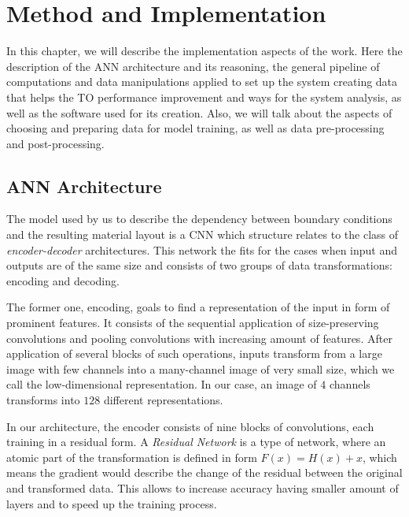 
\chapter{Method and Implementation}

In this chapter, we will describe the implementation aspects of the work.
Here the description of the ANN architecture and its reasoning, the general pipeline of computations and data manipulations applied to set up the system creating data that helps the TO performance improvement and ways for the system analysis, as well as the software used for its creation.
Also, we will talk about the aspects of choosing and preparing data for model training, as well as data pre-processing and post-processing.
\medskip



\section{ANN Architecture}

The model used by us to describe the dependency between boundary conditions and the resulting material layout is a CNN which structure relates to the class of \textit{encoder-decoder} architectures.
This network the fits for the cases when input and outputs are of the same size and consists of two groups of data transformations: encoding and decoding.
\medskip

The former one, encoding, goals to find a representation of the input in form of prominent features.
It consists of the sequential application of size-preserving convolutions and pooling convolutions with increasing amount of features. 
After application of several blocks of such operations, inputs transform from a large image with few channels into a many-channel image of very small size, which we call the low-dimensional representation. 
In our case, an image of $4$ channels transforms into $128$ different representations. 
\medskip

In our architecture, the encoder consists of nine blocks of convolutions, 
each training in a residual form.
A \textit{Residual Network} is a type of network, where an atomic part of the transformation is defined in form $F(x) = H(x) + x $, which means the gradient would describe the change of the residual between the original and transformed data\cite{bibl:resnet}.
This allows to increase accuracy having smaller amount of layers and to speed up the training process.
\medskip

